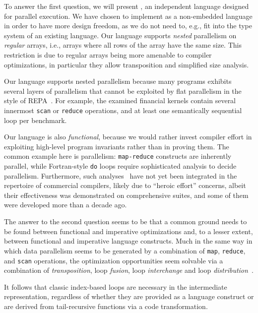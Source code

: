 To answer the first question, we will present \LO{}, an independent
language designed for parallel execution.  We have chosen to implement
\LO{} as a non-embedded language in order to have more design freedom,
as we do not need to, e.g., fit \LO{} into the type system of an
existing language.  Our language supports \textit{nested} parallelism
on \textit{regular} arrays, i.e., arrays where all rows of the array
have the same size.  This restriction is due to regular arrays being
more amenable to compiler optimizations, in particular they allow
transposition and simplified size analysis.

Our language supports nested parallelism because many programs
exhibits several layers of parallelism that cannot be exploited by
flat parallelism in the style of REPA~\cite{keller2010regular}.  For
example, the examined financial kernels contain several innermost
\texttt{scan} or \texttt{reduce} operations, and at least one
semantically sequential loop per benchmark.

Our language is also \textit{functional}, because we would rather
invest compiler effort in exploiting high-level program invariants
rather than in proving them.  The common example here is parallelism:
\texttt{map-reduce} constructs are inherently parallel, while
Fortran-style \texttt{do} loops require sophisticated analysis to
decide parallelism.  Furthermore, such
analyses~\cite{Blume94RangeTest,SUIF,CosPLDI,SummaryMonot} have not
yet been integrated in the repertoire of commercial compilers, likely
due to ``heroic effort'' concerns, albeit their effectiveness was
demonstrated on comprehensive suites, and some of them were developed
more than a decade ago.

The answer to the second question seems to be that a common ground
needs to be found between functional and imperative optimizations and,
to a lesser extent, between functional and imperative language
constructs.  Much in the same way in which data parallelism seems to
be generated by a combination of \texttt{map}, \texttt{reduce}, and
\texttt{scan} operations, the optimization opportunities seem solvable
via a combination of \textit{transposition}, loop \textit{fusion},
loop \textit{interchange} and loop
\textit{distribution}~\cite{OptCompModernArch}.

It follows that classic index-based loops are necessary in the
intermediate representation, regardless of whether they are provided
as a language construct or are derived from tail-recursive functions
via a code transformation.

